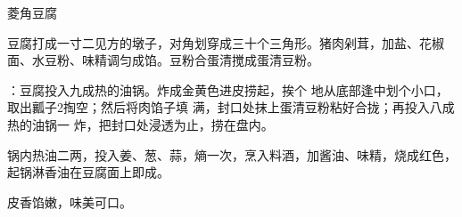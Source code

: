 \begin{recipe}{菱角豆腐}

\ingredients



\cooking

\step 豆腐打成一寸二见方的墩子，对角划穿成三十个三角形。猪肉剁茸，加盐、花椒面、水豆粉、味精调匀成馅。豆粉合蛋清搅成蛋清豆粉。

：豆腐投入九成热的油锅。炸成金黄色进皮捞起，挨个 地从底部逢中划个小口，取出瓤子2掏空；然后将肉馅子填 满，封口处抹上蛋清豆粉粘好合拢；再投入八成热的油锅一 炸，把封口处浸透为止，捞在盘内。

\step 锅内热油二两，投入姜、葱、蒜，熵一次，烹入料酒，加酱油、味精，烧成红色，起锅淋香油在豆腐面上即成。

\notes

皮香馅嫩，味美可口。

\end{recipe}

